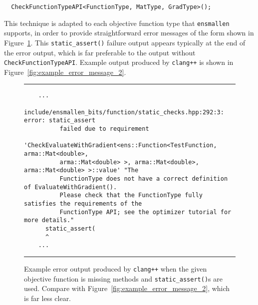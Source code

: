 \begin{verbatim}
  CheckFunctionTypeAPI<FunctionType, MatType, GradType>();
\end{verbatim}

This technique is adapted to each objective function type that {\tt ensmallen}
supports, in order to provide straightforward error messages of the form shown in Figure~\ref{fig:example_error_message_1}.
This {\tt static\_assert()} failure output appears typically at the end of the
error output, which is far preferable to the output without {\tt
CheckFunctionTypeAPI}.  Example output produced by {\tt clang++} is shown in
Figure~\ref{fig:example_error_message_2}.

\begin{figure}[!tb]
\hrule
\vspace{1ex}
\begin{verbatim}
    ...
    include/ensmallen_bits/function/static_checks.hpp:292:3: error: static_assert
          failed due to requirement
          'CheckEvaluateWithGradient<ens::Function<TestFunction, arma::Mat<double>,
          arma::Mat<double> >, arma::Mat<double>, arma::Mat<double> >::value' "The
          FunctionType does not have a correct definition of EvaluateWithGradient().
          Please check that the FunctionType fully satisfies the requirements of the
          FunctionType API; see the optimizer tutorial for more details."
      static_assert(
      ^
    ...
\end{verbatim}
\hrule
\caption{Example error output produced by {\tt clang++} when the given objective
function is missing methods and {\tt static\_assert()}s are used.  Compare with
Figure~\ref{fig:example_error_message_2}, which is far less clear.}
\label{fig:example_error_message_1}
\end{figure}

